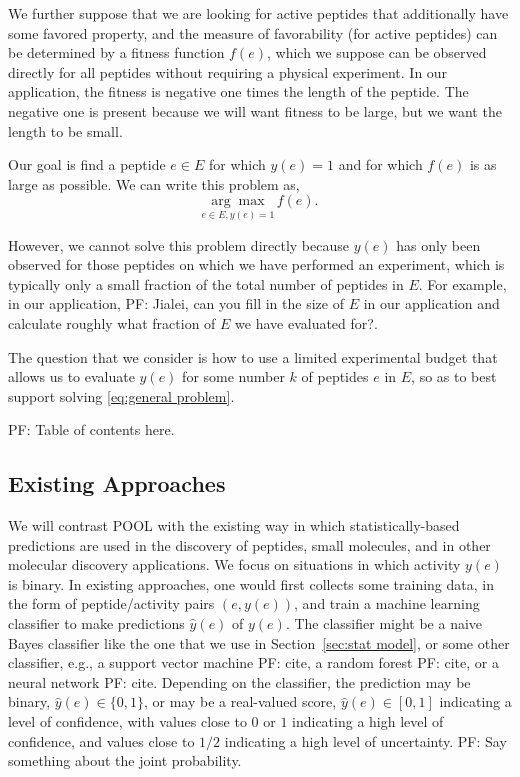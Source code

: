 \documentclass[11pt]{article}
\newcommand{\pfcomment}[1]{{\color{blue} PF: #1}}
\begin{document}
We further suppose that we are looking for active peptides that additionally have some
favored property, and the measure of favorability (for active peptides) can be
determined by a fitness function $f(e)$, which we suppose can be observed directly for all peptides without requiring a physical experiment. In our application, the fitness is negative one times the length of the peptide.  The negative one is present because we will want fitness to be large, but we want the length to be small.

Our goal is find a peptide $e\in E$ for which $y(e)=1$ and for which $f(e)$ is as large as possible.  We can write this problem as,
\begin{equation}
  \underset{e \in E, y(e) = 1}{\arg\max} \, f(e).
  \label{eq:general problem}
\end{equation}

However, we cannot solve this problem directly because $y(e)$ has only been observed for those peptides on which we have performed an experiment, which is typically only a small fraction of the total number of peptides in $E$.  For example, in our application, \pfcomment{Jialei, can you fill in the size of $E$ in our application and calculate roughly what fraction of $E$ we have evaluated for?}.

The question that we consider is how to use a limited experimental budget that allows us to evaluate $y(e)$ for some number $k$ of peptides $e$ in $E$, so as to best support solving \eqref{eq:general problem}.

\pfcomment{Table of contents here.}

\subsection{Existing Approaches}

We will contrast POOL with the existing way in which statistically-based predictions are used in the discovery of peptides, small molecules, and in other molecular discovery applications.
We focus on situations in which activity $y(e)$ is binary. In existing approaches, one would first collects some training data, in the form of peptide/activity pairs $(e,y(e))$, and train a machine learning classifier to make predictions $\hat{y}(e)$ of $y(e)$.  The classifier might be a naive Bayes classifier like the one that we use in Section~\ref{sec:stat model}, or some other classifier, e.g., a support vector machine \pfcomment{cite}, a random forest \pfcomment{cite}, or a neural network\pfcomment{cite}.
Depending on the classifier, the prediction may be binary, $\hat{y}(e) \in \{0,1\}$, or may be a real-valued score, $\hat{y}(e) \in [0,1]$ indicating a level of confidence, with values close to $0$ or $1$ indicating a high level of confidence, and values close to $1/2$ indicating a high level of uncertainty.  \pfcomment{Say something about the joint probability.}
\end{document}
